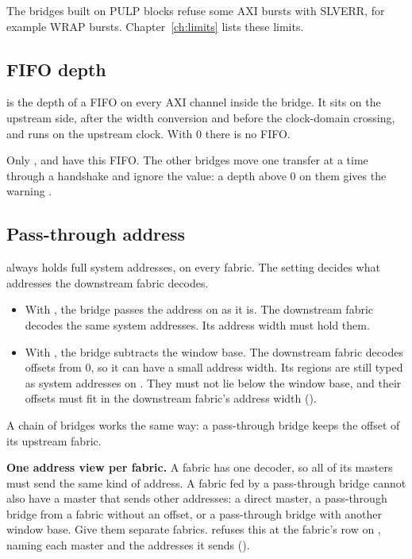The bridges built on PULP blocks refuse some AXI bursts with SLVERR, for example WRAP
bursts. Chapter~\ref{ch:limits} lists these limits.

\subsection{FIFO depth}

 is the depth of a FIFO on every AXI channel inside the bridge. It sits
on the upstream side, after the width conversion and before the clock-domain crossing,
and runs on the upstream clock. With 0 there is no FIFO.

Only ,  and  have this FIFO. The
other bridges move one transfer at a time through a handshake and ignore the value: a
depth above 0 on them gives the warning .

\subsection{Pass-through address}

 always holds full system addresses, on every fabric. The
 setting decides what addresses the downstream fabric decodes.

\begin{itemize}
\item With , the bridge passes the address on as it is. The downstream fabric
  decodes the same system addresses. Its address width must hold them.
\item With , the bridge subtracts the window base. The downstream fabric decodes
  offsets from 0, so it can have a small address width. Its regions are still typed as
  system addresses on . They must not lie below the window base, and
  their offsets must fit in the downstream fabric's address width
  ().
\end{itemize}

A chain of bridges works the same way: a pass-through  bridge keeps the offset of
its upstream fabric.

\textbf{One address view per fabric.} A fabric has one decoder, so all of its masters
must send the same kind of address. A fabric fed by a pass-through  bridge cannot
also have a master that sends other addresses: a direct master, a pass-through 
bridge from a fabric without an offset, or a pass-through  bridge with another
window base. Give them separate fabrics.  refuses this at the fabric's row
on , naming each master and the addresses it sends
().

